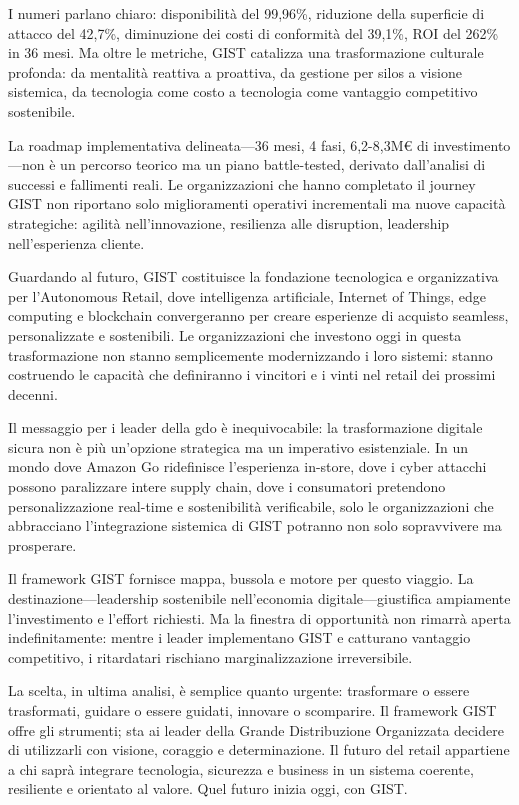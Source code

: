 I numeri parlano chiaro: disponibilità del 99,96\%, riduzione della superficie di attacco del 42,7\%, diminuzione dei costi di conformità del 39,1\%, ROI del 262\% in 36 mesi. Ma oltre le metriche, GIST catalizza una trasformazione culturale profonda: da mentalità reattiva a proattiva, da gestione per silos a visione sistemica, da tecnologia come costo a tecnologia come vantaggio competitivo sostenibile.

La roadmap implementativa delineata—36 mesi, 4 fasi, 6,2-8,3M€ di investimento—non è un percorso teorico ma un piano battle-tested, derivato dall'analisi di successi e fallimenti reali. Le organizzazioni che hanno completato il journey GIST non riportano solo miglioramenti operativi incrementali ma nuove capacità strategiche: agilità nell'innovazione, resilienza alle disruption, leadership nell'esperienza cliente.

Guardando al futuro, GIST costituisce la fondazione tecnologica e organizzativa per l'Autonomous Retail, dove intelligenza artificiale, Internet of Things, edge computing e blockchain convergeranno per creare esperienze di acquisto seamless, personalizzate e sostenibili. Le organizzazioni che investono oggi in questa trasformazione non stanno semplicemente modernizzando i loro sistemi: stanno costruendo le capacità che definiranno i vincitori e i vinti nel retail dei prossimi decenni.

Il messaggio per i leader della \gls{gdo} è inequivocabile: la trasformazione digitale sicura non è più un'opzione strategica ma un imperativo esistenziale. In un mondo dove Amazon Go ridefinisce l'esperienza in-store, dove i cyber attacchi possono paralizzare intere supply chain, dove i consumatori pretendono personalizzazione real-time e sostenibilità verificabile, solo le organizzazioni che abbracciano l'integrazione sistemica di GIST potranno non solo sopravvivere ma prosperare.

Il framework GIST fornisce mappa, bussola e motore per questo viaggio. La destinazione—leadership sostenibile nell'economia digitale—giustifica ampiamente l'investimento e l'effort richiesti. Ma la finestra di opportunità non rimarrà aperta indefinitamente: mentre i leader implementano GIST e catturano vantaggio competitivo, i ritardatari rischiano marginalizzazione irreversibile.

La scelta, in ultima analisi, è semplice quanto urgente: trasformare o essere trasformati, guidare o essere guidati, innovare o scomparire. Il framework GIST offre gli strumenti; sta ai leader della Grande Distribuzione Organizzata decidere di utilizzarli con visione, coraggio e determinazione. Il futuro del retail appartiene a chi saprà integrare tecnologia, sicurezza e business in un sistema coerente, resiliente e orientato al valore. Quel futuro inizia oggi, con GIST.

